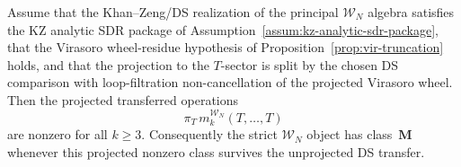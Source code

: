 \begin{theorem}
\label{thm:wn-class-M}
%
%
Assume that the Khan--Zeng/DS realization of the principal
$\mathcal{W}_N$ algebra satisfies the KZ analytic SDR package of
Assumption~\textup{\ref{assum:kz-analytic-sdr-package}}, that the
Virasoro wheel-residue hypothesis of
Proposition~\textup{\ref{prop:vir-truncation}} holds, and that the
projection to the $T$-sector is split by the chosen DS comparison with
loop-filtration non-cancellation of the projected Virasoro wheel.
Then the projected transferred operations
\[
 \pi_T\,m_k^{\mathcal W_N}(T,\ldots,T)
\]
are nonzero for all $k\ge 3$. Consequently the strict
$\mathcal W_N$ object has class~$\mathbf M$ whenever this projected
nonzero class survives the unprojected DS transfer.
\end{theorem}

